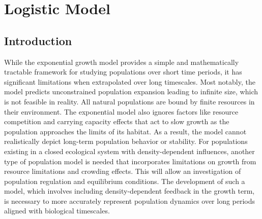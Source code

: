 \chapter{Logistic Model}
\label{ch:08} 



\vspace{1cm}

\section{Introduction}

While the exponential growth model provides a simple and mathematically tractable framework for studying populations over short time periods, it has significant limitations when extrapolated over long timescales. Most notably, the model predicts unconstrained population expansion leading to infinite size, which is not feasible in reality. All natural populations are bound by finite resources in their environment. The exponential model also ignores factors like resource competition and carrying capacity effects that act to slow growth as the population approaches the limits of its habitat. As a result, the model cannot realistically depict long-term population behavior or stability. For populations existing in a closed ecological system with density-dependent influences, another type of population model is needed that incorporates limitations on growth from resource limitations and crowding effects. This will allow an investigation of population regulation and equilibrium conditions. The development of such a model, which involves including density-dependent feedback in the growth term, is necessary to more accurately represent population dynamics over long periods aligned with biological timescales.

